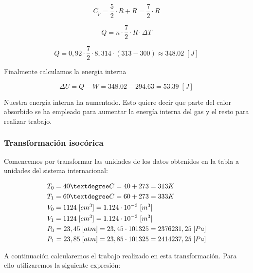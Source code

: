 \documentclass{article}
\begin{document}
\begin{equation}
    C_p = \frac{5}{2} \cdot R + R = \frac{7}{2} \cdot R
\end{equation}

\begin{equation}
    Q = n \cdot \frac{7}{2} \cdot R \cdot \Delta T
\end{equation}

\begin{equation}
    Q = 0,92 \cdot \frac{7}{2} \cdot 8,314 \cdot (313 - 300) \approx 348.02 \; [J]
\end{equation}

Finalmente calculamos la energia interna

\begin{equation}
    \Delta U = Q - W = 348.02 - 294.63 = 53.39 \; [J]
\end{equation}

Nuestra energia interna ha aumentado. Esto quiere decir que parte del calor absorbido se ha empleado para aumentar la energía interna del gas y
 el resto para realizar trabajo.

\subsubsection{Transformación isocórica}

Comencemos por transformar las unidades de los datos obtenidos en la tabla a unidades del sistema internacional:

\begin{equation}
    \begin{split}
        & T_0 = 40 \textdegree C = 40 + 273 = 313 K  \\
        & T_1 = 60 \textdegree C = 60 + 273 = 333 K  \\
        & V_0 = 1124 \; [cm^3] = 1.124 \cdot 10^{-3} \; [m^3]  \\
        & V_1 = 1124 \; [cm^3] = 1.124 \cdot 10^{-3} \; [m^3]  \\
        & P_0 = 23,45 \; [atm] = 23,45 \cdot 101325 = 2376231,25 \; [Pa] \\
        & P_1 = 23,85 \; [atm] = 23,85 \cdot 101325 = 2414237,25 \; [Pa] \\
    \end{split}
\end{equation}

A continuación calcularemos el trabajo realizado en esta transformación. Para ello utilizaremos la siguiente expresión:
\end{document}

